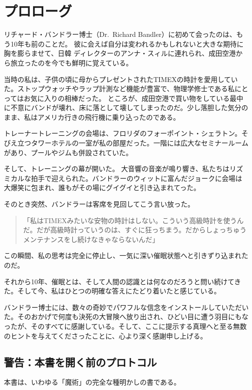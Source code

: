 \ifja
    \chapter*{プロローグ}
    
    リチャード・バンドラー博士（Dr.~Richard Bandler）に初めて会ったのは、もう10年も前のことだ。
    彼に会えば自分は変われるかもしれないと大きな期待に胸を膨らませて、日韓 \NLP ディレクターのアンナ・スィルに連れられ、成田空港から旅立ったのを今でも鮮明に覚えている。

    当時の私は、子供の頃に母からプレゼントされたTIMEXの時計を愛用していた。ストップウォッチやラップ計測など機能が豊富で、物理学修士である私にとってはお気に入りの相棒だった。
    ところが、成田空港で買い物をしている最中に不意にバンドが壊れ、床に落として壊してしまったのだ。少し落胆した気分のまま、私はアメリカ行きの飛行機に乗り込ったのである。

    トレーナートレーニングの会場は、フロリダのフォーポイント・シェラトン。そびえ立つタワーホテルの一室が私の部屋だった。一階には広大なセミナールームがあり、プールやジムも併設されていた。

    そして、トレーニングの幕が開いた。
    大音響の音楽が鳴り響き、私たちはリズミカルな拍手で迎えられた。バンドラーのウィットに富んだジョークに会場は大爆笑に包まれ、誰もがその場にグイグイと引き込まれてった。

    そのとき突然、バンドラーは客席を見回してこう言い放った。
    \begin{quote}
        「私はTIMEXみたいな安物の時計はしない。こういう高級時計を使うんだ。だが高級時計っていうのは、すぐに狂っちまう。だからしょっちゅうメンテナンスをし続けなきゃならないんだ」
    \end{quote}

    この瞬間、私の思考は完全に停止し、一気に深い催眠状態へと引きずり込まれたのだ。

    それから10年、催眠とは、そして人間の認識とは何なのだろうと問い続けてきた。そして今、私はひとつの明確な答えにたどり着いたと感じている。

    バンドラー博士には、数々の奇妙でパワフルな信念をインストールしていただいた。そのおかげで何度も決死の大冒険へ放り出され、ひどい目に遭う羽目にもなったが、そのすべてに感謝している。そして、ここに提示する真理へと至る無数のヒントを与えてくださったことに、心より深く感謝申し上げる。

    \section*{警告：本書を開く前のプロトコル}
    本書は、いわゆる「魔術」の完全な種明かしの書である。

